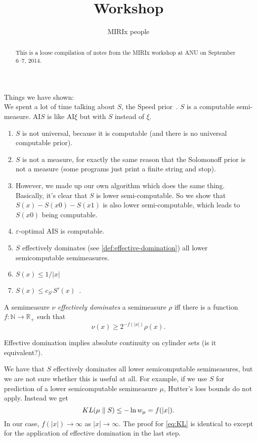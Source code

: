 \documentclass[a4paper]{article}
\title{Workshop}
\author{MIRIx people}
\begin{document}
\maketitle

\begin{abstract}
This is a loose compilation of notes from the MIRIx workshop at ANU on
September 6--7, 2014.
\end{abstract}

Things we have shown:\\

We spent a lot of time talking about $S$, the Speed prior~\cite{Schmidhuber:2002}.
$S$ is a computable semi-measure.
AI$S$ is like AI$\xi$ but with $S$ instead of $\xi$.\\
%
\begin{enumerate}
\item $S$ is not universal, because it is computable (and there is no universal computable prior).
\item $S$ is not a measure, for exactly the same reason that the Solomonoff prior is not a measure
	(some programs just print a finite string and stop).
\item However, we made up our own algorithm which does the same thing. Basically, it's clear that $S$ is lower semi-computable. So we show that $S(x)- S(x0) - S(x1)$ is also lower semi-computable, which leads to $S(x0)$ being computable.
\item $\varepsilon$-optimal AIS is computable.
\item $S$ effectively dominates (see \autoref{def:effective-domination}) all lower semicomputable semimeasures.
\item $S(x) \leq 1 / |x|$
\item $S(x) \leq c_{S'} S'(x)$~\cite[Eq.\ 7]{Schmidhuber:2002}.
\end{enumerate}

\begin{definition}
\label{def:effective-domination}
A semimeasure $\nu$ \emph{effectively dominates} a semimeasure $\rho$ iff
there is a function $f: \mathbb{N} \to \mathbb{R}_+$ such that
\[
\nu(x) \geq 2^{-f(|x|)} \rho(x).
\]
\end{definition}

Effective domination implies absolute continuity on cylinder sets
(is it equivalent?).

We have that $S$ effectively dominates all lower semicomputable semimeasures,
but we are not sure whether this is useful at all.
For example, if we use $S$ for prediction of a lower semicomputable semimeasure $\mu$,
Hutter's loss bounds do not apply.
Instead we get
\begin{equation}
\label{eq:KL}
KL(\mu \parallel S) \leq - \ln w_\mu = f(|x|).
\end{equation}
In our case, $f(|x|) \to \infty$ as $|x| \to \infty$.
The proof for \eqref{eq:KL} is identical to \cite[Thm.\ 3.19]{Hutter:2005}
except for the application of effective domination in the last step.
\end{document}
